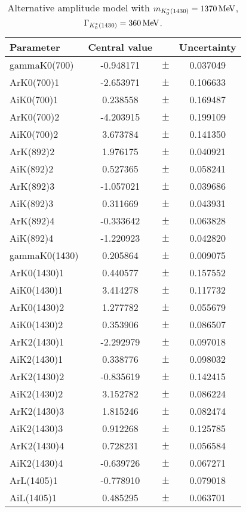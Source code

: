 \clearpage

\begin{table}
\centering
\caption{Alternative amplitude model with $m_{K^*_0(1430)} = 1370 \text{\,Me\kern -0.1em V}$, $\Gamma_{K^*_0(1430)} = 360 \text{\,Me\kern -0.1em V}$.}
\begin{tiny}
\begin{tabular}{lccc}
\toprule
Parameter & Central value & & Uncertainty\\
\midrule
gammaK0(700) & -0.948171 & $\pm$ & 0.037049 \\
ArK0(700)1 & -2.653971 & $\pm$ & 0.106633 \\
AiK0(700)1 & 0.238558 & $\pm$ & 0.169487 \\
ArK0(700)2 & -4.203915 & $\pm$ & 0.199109 \\
AiK0(700)2 & 3.673784 & $\pm$ & 0.141350 \\
ArK(892)2 & 1.976175 & $\pm$ & 0.040921 \\
AiK(892)2 & 0.527365 & $\pm$ & 0.058241 \\
ArK(892)3 & -1.057021 & $\pm$ & 0.039686 \\
AiK(892)3 & 0.311669 & $\pm$ & 0.043931 \\
ArK(892)4 & -0.333642 & $\pm$ & 0.063828 \\
AiK(892)4 & -1.220923 & $\pm$ & 0.042820 \\
gammaK0(1430) & 0.205864 & $\pm$ & 0.009075 \\
ArK0(1430)1 & 0.440577 & $\pm$ & 0.157552 \\
AiK0(1430)1 & 3.414278 & $\pm$ & 0.117732 \\
ArK0(1430)2 & 1.277782 & $\pm$ & 0.055679 \\
AiK0(1430)2 & 0.353906 & $\pm$ & 0.086507 \\
ArK2(1430)1 & -2.292979 & $\pm$ & 0.097018 \\
AiK2(1430)1 & 0.338776 & $\pm$ & 0.098032 \\
ArK2(1430)2 & -0.835619 & $\pm$ & 0.142415 \\
AiK2(1430)2 & 3.152782 & $\pm$ & 0.086224 \\
ArK2(1430)3 & 1.815246 & $\pm$ & 0.082474 \\
AiK2(1430)3 & 0.912268 & $\pm$ & 0.125785 \\
ArK2(1430)4 & 0.728231 & $\pm$ & 0.056584 \\
AiK2(1430)4 & -0.639726 & $\pm$ & 0.067271 \\
ArL(1405)1 & -0.778910 & $\pm$ & 0.079018 \\
AiL(1405)1 & 0.485295 & $\pm$ & 0.063701 \\

\end{tabular}
\end{tiny}
\end{table}
